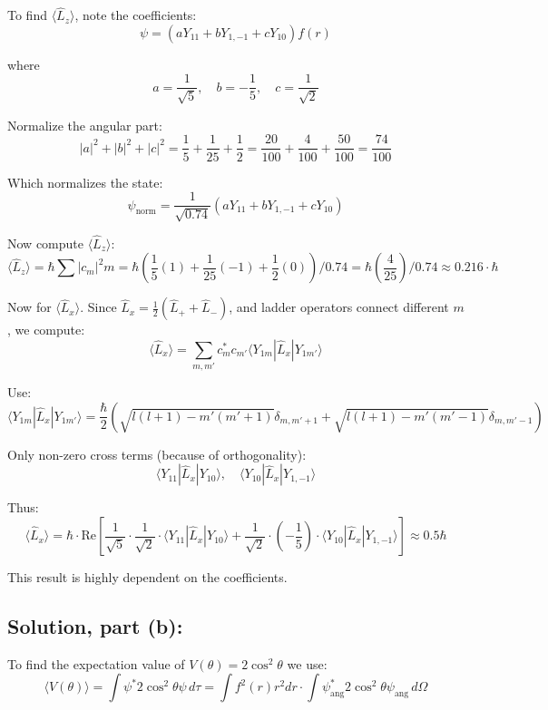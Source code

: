 \documentclass[12pt]{article}
\begin{document}
        To find \( \langle \hat{L}_z \rangle \), note the coefficients:
        \[
            \psi = \left( a Y_{11} + b Y_{1,-1} + c Y_{10} \right) f(r)
        \]
        
        where
        \[
            a = \frac{1}{\sqrt{5}}, \quad b = -\frac{1}{5}, \quad c = \frac{1}{\sqrt{2}}
        \]

        Normalize the angular part:
        \[
            |a|^2 + |b|^2 + |c|^2 = \frac{1}{5} + \frac{1}{25} + \frac{1}{2} = \frac{20}{100} + \frac{4}{100} + \frac{50}{100} = \frac{74}{100}
        \]

        Which normalizes the state:
        \[
            \psi_{\text{norm}} = \frac{1}{\sqrt{0.74}} \left( a Y_{11} + b Y_{1,-1} + c Y_{10} \right)
        \]

        Now compute \( \langle \hat{L}_z \rangle \):
        \[
            \langle \hat{L}_z \rangle = \hbar \sum |c_m|^2 m = \hbar \left( \frac{1}{5}(1) + \frac{1}{25}(-1) + \frac{1}{2}(0) \right) / 0.74 = \hbar \left( \frac{4}{25} \right)/0.74 \approx \boldsymbol{\boxed{0.216 \cdot \hbar}}
        \]

        Now for \( \langle \hat{L}_x \rangle \). Since \( \hat{L}_x = \frac{1}{2}(\hat{L}_+ + \hat{L}_-) \), and ladder operators connect different \( m \), we compute:
        \[
            \langle \hat{L}_x \rangle = \sum_{m, m'} c_m^* c_{m'} \langle Y_{1m} | \hat{L}_x | Y_{1m'} \rangle
        \]

        Use:
        \[
            \langle Y_{1m} | \hat{L}_x | Y_{1m'} \rangle = \frac{\hbar}{2} \left( \sqrt{l(l+1) - m'(m'+1)} \delta_{m,m'+1} + \sqrt{l(l+1) - m'(m'-1)} \delta_{m,m'-1} \right)
        \]

        Only non-zero cross terms (because of orthogonality):
        \[
            \langle Y_{11} | \hat{L}_x | Y_{10} \rangle, \quad \langle Y_{10} | \hat{L}_x | Y_{1,-1} \rangle
        \]

        Thus:
        \[
            \langle \hat{L}_x \rangle = \hbar \cdot \text{Re} \left[ \frac{1}{\sqrt{5}} \cdot \frac{1}{\sqrt{2}} \cdot \langle Y_{11} | \hat{L}_x | Y_{10} \rangle + \frac{1}{\sqrt{2}} \cdot \left(-\frac{1}{5}\right) \cdot \langle Y_{10} | \hat{L}_x | Y_{1,-1} \rangle \right] \approx \boldsymbol{\boxed{0.5 \hbar}}
        \]

        This result is highly dependent on the coefficients.

    \subsection{Solution, part (b):}
        To find the expectation value of \( V(\theta) = 2 \cos^2 \theta \) we use:
        \[
            \langle V(\theta) \rangle = \int \psi^* 2 \cos^2 \theta \psi \, d\tau = \int f^2(r) r^2 dr \cdot \int \psi_{\text{ang}}^* 2 \cos^2 \theta \psi_{\text{ang}} \, d\Omega
        \]
\end{document}
